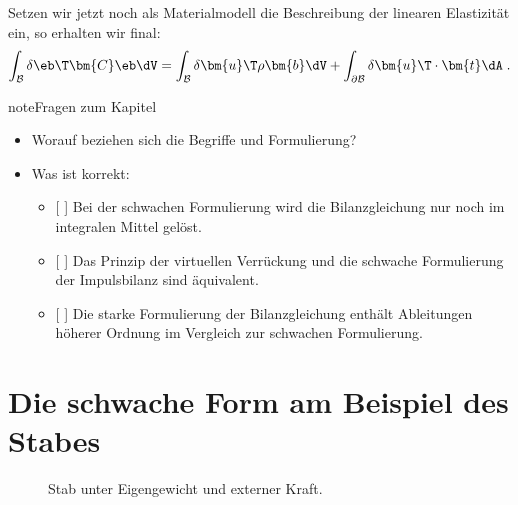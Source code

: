\documentclass[letterpaper,10pt,german]{jupyterBook}
\let\sphinxpxdimen\pdfpxdimen\else\newdimen\sphinxpxdimen
\begin{document}
\sphinxAtStartPar
Setzen wir jetzt noch als Materialmodell die Beschreibung der linearen Elastizität ein, so erhalten wir final:
\begin{equation}\label{equation:chapters/chapter2/FEM:weakform_04}
\begin{split}\int_{\mathcal{B}} \delta\eb\T \bm{C} \eb \dV = \int_{\mathcal{B}} \delta \bm{u}\T \rho \bm{b} \dV + \int_{\partial\mathcal{B}} \delta \bm{u}\T \cdot \bm{t} \dA \; .\end{split}
\end{equation}
\begin{sphinxadmonition}{note}{Fragen zum Kapitel}

\sphinxAtStartPar
{}
\begin{itemize}
\item {} 
\sphinxAtStartPar
Worauf beziehen sich die Begriffe  und  Formulierung?

\item {} 
\sphinxAtStartPar
Was ist korrekt:
\begin{itemize}
\item {} 
\sphinxAtStartPar
{[} {]} Bei der schwachen Formulierung wird die Bilanzgleichung nur noch im integralen Mittel gelöst.

\item {} 
\sphinxAtStartPar
{[} {]} Das Prinzip der virtuellen Verrückung und die schwache Formulierung der Impulsbilanz sind äquivalent.

\item {} 
\sphinxAtStartPar
{[} {]} Die starke Formulierung der Bilanzgleichung enthält Ableitungen höherer Ordnung im Vergleich zur schwachen Formulierung.

\end{itemize}

\end{itemize}
\end{sphinxadmonition}

\sphinxstepscope




\section{Die schwache Form am Beispiel des Stabes}
\label{\detokenize{chapters/chapter2/1dFEM:die-schwache-form-am-beispiel-des-stabes}}\label{\detokenize{chapters/chapter2/1dFEM::doc}}
\begin{figure}[htbp]
\centering
\capstart

\noindent\sphinxincludegraphics[height=400\sphinxpxdimen]{{Stab}.png}
\caption{Stab unter Eigengewicht und externer Kraft.}\label{\detokenize{chapters/chapter2/1dFEM:stab-fig}}\end{figure}
\end{document}
